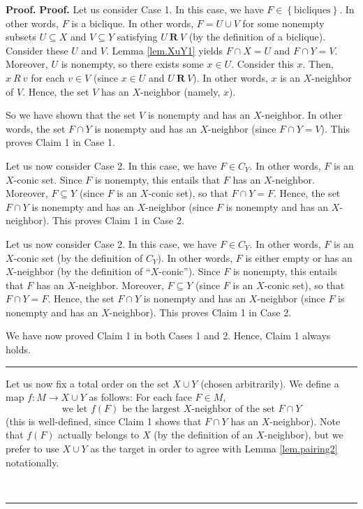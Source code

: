 \documentclass[numbers=enddot,12pt,final,onecolumn,notitlepage]{scrartcl}%
\theoremstyle{definition}
\newenvironment{proof}[1][Proof]{\noindent\textbf{#1.} }{\ \rule{0.5em}{0.5em}}
\newenvironment{verlong}{}{}
\newenvironment{vershort}{}{}
\begin{document}
\begin{proof}
\begin{proof}
\begin{verlong}
Let us consider Case 1. In this case, we have $F\in\left\{  \text{bicliques}%
\right\}  $. In other words, $F$ is a biclique. In other words, $F=U\cup V$
for some nonempty subsets $U\subseteq X$ and $V\subseteq Y$ satisfying
$U\ \mathbf{R}\ V$ (by the definition of a biclique). Consider these $U$ and
$V$. Lemma \ref{lem.XuY1} yields $F\cap X=U$ and $F\cap Y=V$. Moreover, $U$ is
nonempty, so there exists some $x\in U$. Consider this $x$. Then, $x\ R\ v$
for each $v\in V$ (since $x\in U$ and $U\ \mathbf{R}\ V$). In other words, $x$
is an $X$-neighbor of $V$. Hence, the set $V$ has an $X$-neighbor (namely, $x$).

So we have shown that the set $V$ is nonempty and has an $X$-neighbor. In
other words, the set $F\cap Y$ is nonempty and has an $X$-neighbor (since
$F\cap Y=V$). This proves Claim 1 in Case 1.
\end{verlong}

\begin{vershort}
Let us now consider Case 2. In this case, we have $F\in C_{Y}$. In other
words, $F$ is an $X$-conic set. Since $F$ is nonempty, this entails that $F$
has an $X$-neighbor. Moreover, $F\subseteq Y$ (since $F$ is an $X$-conic set),
so that $F\cap Y=F$. Hence, the set $F\cap Y$ is nonempty and has an
$X$-neighbor (since $F$ is nonempty and has an $X$-neighbor). This proves
Claim 1 in Case 2.
\end{vershort}

\begin{verlong}
Let us now consider Case 2. In this case, we have $F\in C_{Y}$. In other
words, $F$ is an $X$-conic set (by the definition of $C_{Y}$). In other words,
$F$ is either empty or has an $X$-neighbor (by the definition of
\textquotedblleft$X$-conic\textquotedblright). Since $F$ is nonempty, this
entails that $F$ has an $X$-neighbor. Moreover, $F\subseteq Y$ (since $F$ is
an $X$-conic set), so that $F\cap Y=F$. Hence, the set $F\cap Y$ is nonempty
and has an $X$-neighbor (since $F$ is nonempty and has an $X$-neighbor). This
proves Claim 1 in Case 2.
\end{verlong}

We have now proved Claim 1 in both Cases 1 and 2. Hence, Claim 1 always holds.
\end{proof}

Let us now fix a total order on the set $X\cup Y$ (chosen arbitrarily). We
define a map $f:M\rightarrow X\cup Y$ as follows: For each face $F\in M$,
\[
\text{we let }f\left(  F\right)  \text{ be the largest }X\text{-neighbor of
the set }F\cap Y
\]
(this is well-defined, since Claim 1 shows that $F\cap Y$ has an
$X$-neighbor). Note that $f\left(  F\right)  $ actually belongs to $X$ (by the
definition of an $X$-neighbor), but we prefer to use $X\cup Y$ as the target
in order to agree with Lemma \ref{lem.pairing2} notationally.


\end{proof}
\end{document}
